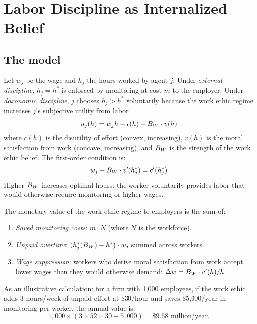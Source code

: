 \section{Labor Discipline as Internalized Belief}
\label{sec:ch26-internalized}

\subsection{The model}

\begin{model}
\label{mod:discipline}
Let $w_j$ be the wage and $h_j$ the hours worked by agent $j$.
Under \emph{external discipline}, $h_j = h^*$ is enforced by monitoring at cost $m$ to the employer.
Under \emph{doxonomic discipline}, $j$ chooses $h_j > h^*$ voluntarily because the work ethic regime increases $j$'s subjective utility from labor:
\[
  u_j(h) = w_j h - c(h) + B_{W} \cdot v(h)
\]
where $c(h)$ is the disutility of effort (convex, increasing), $v(h)$ is the moral satisfaction from work (concave, increasing), and $B_{W}$ is the strength of the work ethic belief.
The first-order condition is:
\[
  w_j + B_{W} \cdot v'(h_j^*) = c'(h_j^*)
\]
Higher $B_{W}$ increases optimal hours: the worker voluntarily provides labor that would otherwise require monitoring or higher wages.
\end{model}

\begin{proposition}
\label{prop:work-ethic-value}
The monetary value of the work ethic regime to employers is the sum of:
\begin{enumerate}[nosep]
  \item \emph{Saved monitoring costs}: $m \cdot N$ (where $N$ is the workforce).
  \item \emph{Unpaid overtime}: $(h_j^*(B_{W}) - h^*) \cdot w_j$ summed across workers.
  \item \emph{Wage suppression}: workers who derive moral satisfaction from work accept lower wages than they would otherwise demand: $\Delta w = B_{W} \cdot v'(h) / h$.
\end{enumerate}
As an illustrative calculation: for a firm with 1,000 employees, if the work ethic adds 3 hours/week of unpaid effort at \$30/hour and saves \$5,000/year in monitoring per worker, the annual value is:
\[
  1{,}000 \times (3 \times 52 \times 30 + 5{,}000) = \$9.68 \text{ million/year.}
\]
\end{proposition}

